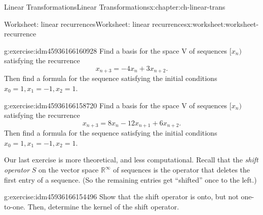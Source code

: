 \documentclass[oneside,10pt,]{book}
\numberwithin{equation}{section}
\newcommand{\R}{\mathbb{R}}
\begin{document}
\begin{chapterptx}{Linear Transformations}{}{Linear Transformations}{}{}{x:chapter:ch-linear-trans}
\begin{worksheet-section}{Worksheet: linear recurrences}{}{Worksheet: linear recurrences}{}{}{x:worksheet:worksheet-recurrence}
\begin{divisionexercise}{2}{}{}{g:exercise:idm45936166160928}
Find a basis for the space \textdollar{}V\textdollar{} of sequences \([x_n)\) satisfying the recurrence%
\begin{equation*}
x_{n+3} = -4x_n+3x_{n+2}\text{.}
\end{equation*}
Then find a formula for the sequence satisfying the initial conditions \(x_0=1, x_1=-1, x_2=1\).%
\end{divisionexercise}%
\begin{divisionexercise}{3}{}{}{g:exercise:idm45936166158720}%
Find a basis for the space \textdollar{}V\textdollar{} of sequences \([x_n)\) satisfying the recurrence%
\begin{equation*}
x_{n+3} = 8x_n-12x_{n+1}+6x_{n+2}\text{.}
\end{equation*}
Then find a formula for the sequence satisfying the initial conditions \(x_0=1, x_1=-1, x_2=1\).%
\end{divisionexercise}%
Our last exercise is more theoretical, and less computational. Recall that the \emph{shift operator} \(S\) on the vector space \(\R^\infty\) of sequences is the operator that deletes the first entry of a sequence. (So the remaining entries get ``shifted'' once to the left.)%
\begin{divisionexercise}{4}{}{}{g:exercise:idm45936166154496}%
Show that the shift operator is onto, but not one-to-one. Then, determine the kernel of the shift operator.%
\end{divisionexercise}%
\end{worksheet-section}
\restoregeometry
\end{chapterptx}
%
%
\typeout{************************************************}
\typeout{************************************************}
%
\end{document}
